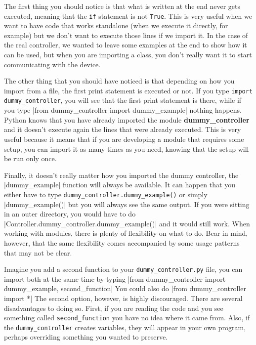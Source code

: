 The first thing you should notice is that what is written at the end never gets executed, meaning that the \texttt{if} statement is not
\texttt{True}. This is very useful when we want to have code that works standalone (when we execute it directly, for example) but we don't want to execute those lines if we import it. In the case of the real controller, we wanted to leave some examples at the end to show how it can be used, but when you are importing a class, you don't really want it to start communicating with the device.

The other thing that you should have noticed is that depending on how you import from a file, the first print statement is executed or not. If
you type \texttt{import dummy_controller}, you will see that the first print statement is there, while if you type |from dummy_controller import dummy_example| nothing happens. Python knows that you have already imported the module \textbf{dummy\_controller} and it doesn't execute again the lines that were already executed. This is very useful because it means that if you are developing a module that requires some setup, you can import it as many times as you need, knowing that the setup will be run only once. 

Finally, it doesn't really matter how you imported the dummy controller, the |dummy_example| function will always be available. It can happen that you either have to type \texttt{dummy_controller.dummy_example()} or simply |dummy_example()| but you will always see the same output. If you were sitting in an outer directory, you would have to do |Controller.dummy_controller.dummy_example()| and it would still work. When working with modules, there is plenty of flexibility on what to do. Bear in mind, however, that the same flexibility comes accompanied by some usage patterns that may not be clear.

Imagine you add a second function to your \texttt{dummy_controller.py} file, you can import both at the same time by typing
|from dummy_controller import dummy_example, second_function| You could also do |from dummy_controller import *| The
second option, however, is highly discouraged. There are several disadvantages to doing so. First, if you are reading the code and you
see something called \texttt{second_function} you have no idea where it came from. Also, if the \texttt{dummy_controller} creates variables, they will appear in your own program, perhaps overriding something you wanted to preserve.

